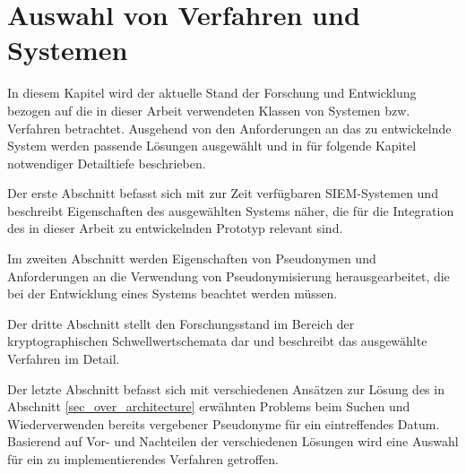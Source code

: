 \chapter{Auswahl von Verfahren und Systemen}

\label{cha_state}

In diesem Kapitel wird der aktuelle Stand der Forschung und Entwicklung bezogen auf die in dieser Arbeit verwendeten Klassen von Systemen bzw. Verfahren betrachtet. Ausgehend von den Anforderungen an das zu entwickelnde System werden passende Lösungen ausgewählt und in für folgende Kapitel notwendiger Detailtiefe beschrieben. 

Der erste Abschnitt befasst sich mit zur Zeit verfügbaren SIEM-Systemen und beschreibt Eigenschaften des ausgewählten Systems näher, die für die Integration des in dieser Arbeit zu entwickelnden Prototyp relevant sind.

Im zweiten Abschnitt werden Eigenschaften von Pseudonymen und Anforderungen an die Verwendung von Pseudonymisierung herausgearbeitet, die bei der Entwicklung eines Systems beachtet werden müssen.

Der dritte Abschnitt stellt den Forschungsstand im Bereich der kryptographischen Schwellwertschemata dar und beschreibt das ausgewählte Verfahren im Detail.

Der letzte Abschnitt befasst sich mit verschiedenen Ansätzen zur Lösung des in Abschnitt \ref{sec_over_architecture} erwähnten Problems beim Suchen und Wiederverwenden bereits vergebener Pseudonyme für ein eintreffendes Datum. Basierend auf Vor- und Nachteilen der verschiedenen Lösungen wird eine Auswahl für ein zu implementierendes Verfahren getroffen.  







